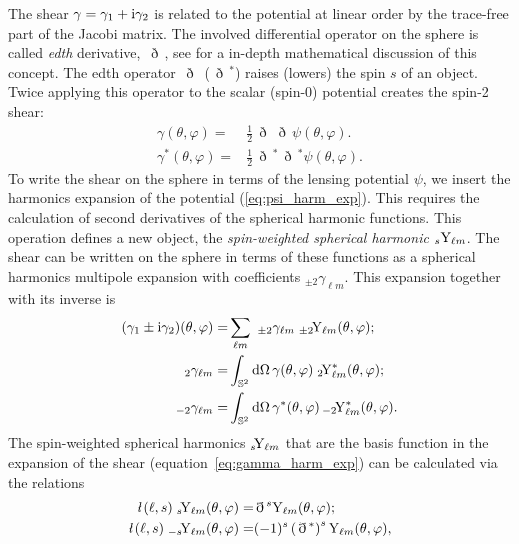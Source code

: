 \documentclass[fleqn,usenatbib]{mnras} %
\newcommand{\ellbar}{\hbox{\it \l}\,}
\newcommand{\edth}{\,\eth\,}
\begin{document}
The shear $\gamma = \gamma_1 + {\rm i} \gamma_2$ is related to the potential at
linear order by the trace-free part of the Jacobi matrix. The involved
differential operator on the sphere is called \emph{edth} derivative, $\edth$,
see \cite{2005PhRvD..72b3516C} for a in-depth mathematical discussion of this
concept. The edth operator $\edth$ ($\edth^\ast$) raises (lowers) the spin $s$
of an object. Twice applying this operator to the scalar (spin-0) potential
creates the spin-2 shear:
%
\begin{align}
  \gamma(\theta, \varphi) = & \frac 1 2 \edth \edth \psi(\theta, \varphi).
    \nonumber \\
  \gamma^\ast(\theta, \varphi) = & \frac 1 2 \edth^\ast \edth^\ast \psi(\theta, \varphi).
  \label{gamma_psi_spher}
\end{align}
%
To write the shear on the sphere in terms of the lensing potential $\psi$, we
insert the harmonics expansion of the potential (\ref{eq:psi_harm_exp}). This
requires the calculation of second derivatives of the spherical harmonic functions.
This operation defines a new object, the \emph{spin-weighted spherical
harmonic} $_s{\rm Y}_{\ell m}$. The shear can be written on the sphere in terms
of these functions as a spherical harmonics multipole expansion with
coefficients $_{\pm 2} \gamma_{\ell m}$. This expansion together with its inverse
is
%
%
\begin{align}
  (\gamma_1 \pm {\rm i} \gamma_2)(\theta, \varphi) = & \sum_{\ell m} \,\, _{\pm 2}\gamma_{\ell m} \; _{\pm 2}\!{\rm Y}_{\ell m}(\theta, \varphi);
  \label{eq:gamma_harm_exp}
    \\
  \, _2 \gamma_{\ell m} = & \int_{\mathbb{S}^2} {\rm d} \Omega \, \gamma(\theta, \varphi) \;  _2\!{\rm Y}^\ast_{\ell m}(\theta, \varphi);
    \nonumber \\
  \, _{-2} \gamma_{\ell m} = & \int_{\mathbb{S}^2} {\rm d} \Omega \, \gamma^\ast(\theta, \varphi) \,  _{-2}\!{\rm Y}^\ast_{\ell m}(\theta, \varphi).
  \label{eq:gamma_harm_exp_inv}
\end{align}
%
The spin-weighted spherical harmonics $_s\!{\rm Y}_{\ell m}$ that are the basis function
in the expansion of the shear (equation~\ref{eq:gamma_harm_exp}) can be calculated via the relations
%
%
\begin{align}
  \ellbar(\ell, s) \; _s\!{\rm Y}_{\ell m}(\theta, \varphi) = & \edth^s {\rm Y}_{\ell m}(\theta, \varphi);
    \nonumber \\
  \ellbar(\ell, s) \; _{-s}\!{\rm Y}_{\ell m}(\theta, \varphi) = & (-1)^s \left(\edth^\ast\right)^s {\rm Y}_{\ell m}(\theta, \varphi),
  \label{eq:sYlm_def} 
\end{align}
\end{document}
